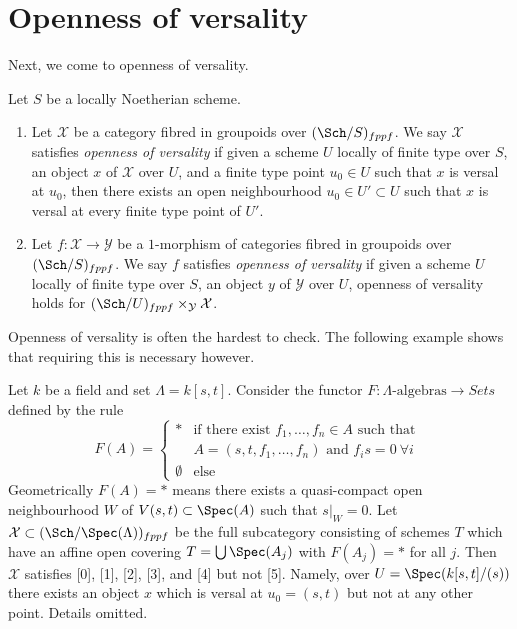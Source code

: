 \section{Openness of versality}
\label{section-openness-versality}

\noindent
Next, we come to openness of versality.

\begin{definition}
\label{definition-openness-versality}
Let $S$ be a locally Noetherian scheme.
\begin{enumerate}
\item Let $\mathcal{X}$ be a category
fibred in groupoids over $(\Sch/S)_{fppf}$. We say $\mathcal{X}$ satisfies
{\it openness of versality} if given a scheme $U$ locally of finite type
over $S$, an object $x$ of $\mathcal{X}$ over $U$, and a finite type point
$u_0 \in U$ such that $x$ is versal at $u_0$, then there exists an open
neighbourhood $u_0 \in U' \subset U$ such that $x$ is versal at every finite
type point of $U'$.
\item Let $f : \mathcal{X} \to \mathcal{Y}$ be a $1$-morphism of categories
fibred in groupoids over $(\Sch/S)_{fppf}$. We say $f$ satisfies
{\it openness of versality} if given a scheme $U$ locally of finite type
over $S$, an object $y$ of $\mathcal{Y}$ over $U$, openness
of versality holds for
$(\Sch/U)_{fppf} \times_\mathcal{Y} \mathcal{X}$.
\end{enumerate}
\end{definition}

\noindent
Openness of versality is often the hardest to check. The following example
shows that requiring this is necessary however.

\begin{example}
\label{example-versality}
Let $k$ be a field and set $\Lambda = k[s, t]$. Consider the functor
$F : \Lambda\text{-algebras} \longrightarrow \textit{Sets}$
defined by the rule
$$
F(A) =
\left\{
\begin{matrix}
* & \text{if there exist }f_1, \ldots, f_n \in A\text{ such that } \\
  & A = (s, t, f_1, \ldots, f_n)\text{ and } f_i s = 0\ \forall i \\
\emptyset & \text{else}
\end{matrix}
\right.
$$
Geometrically $F(A) = *$ means there exists a quasi-compact open neighbourhood
$W$ of $V(s, t) \subset \Spec(A)$ such that $s|_W = 0$.
Let $\mathcal{X} \subset (\Sch/\Spec(\Lambda))_{fppf}$ be the full
subcategory consisting of schemes $T$ which have an affine open covering
$T = \bigcup \Spec(A_j)$ with $F(A_j) = *$ for all $j$. Then $\mathcal{X}$
satisfies [0], [1], [2], [3], and [4] but not [5]. Namely, over
$U = \Spec(k[s, t]/(s))$
there exists an object $x$ which is versal at $u_0 = (s, t)$ but not
at any other point. Details omitted.
\end{example}

